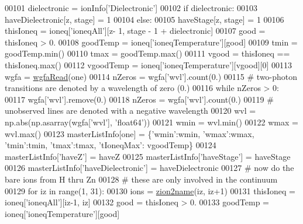 \begin{DoxyCode}
{{00101             dielectronic = ionInfo[\textcolor{stringliteral}{'Dielectronic'}]
00102             \textcolor{keywordflow}{if} dielectronic:
00103                 haveDielectronic[z, stage] = 1
00104             \textcolor{keywordflow}{else}:
00105                 haveStage[z, stage] = 1
00106             thisIoneq = ioneq[\textcolor{stringliteral}{'ioneqAll'}][z- 1, stage - 1 + dielectronic]
00107             good = thisIoneq > 0.
00108             goodTemp = ioneq[\textcolor{stringliteral}{'ioneqTemperature'}][good]
00109             tmin = goodTemp.min()
00110             tmax = goodTemp.max()
00111             vgood = thisIoneq == thisIoneq.max()
00112             vgoodTemp = ioneq[\textcolor{stringliteral}{'ioneqTemperature'}][vgood][0]
00113             wgfa = \hyperlink{namespacepyneb_1_1utils_1_1__chianti__tools_a3ef36a1d0a4df4cab94a392d2a3da980}{wgfaRead}(one)
00114             nZeros = wgfa[\textcolor{stringliteral}{'wvl'}].count(0.)
00115             \textcolor{comment}{# two-photon transitions are denoted by a wavelength of zero (0.)}
00116             \textcolor{keywordflow}{while} nZeros > 0:
00117                 wgfa[\textcolor{stringliteral}{'wvl'}].remove(0.)
00118                 nZeros = wgfa[\textcolor{stringliteral}{'wvl'}].count(0.)
00119             \textcolor{comment}{# unobserved lines are denoted with a negative wavelength}
00120             wvl = np.abs(np.asarray(wgfa[\textcolor{stringliteral}{'wvl'}], \textcolor{stringliteral}{'float64'}))
00121             wmin = wvl.min()
00122             wmax = wvl.max()
00123             masterListInfo[one] = \{\textcolor{stringliteral}{'wmin'}:wmin, \textcolor{stringliteral}{'wmax'}:wmax, \textcolor{stringliteral}{'tmin'}:tmin, \textcolor{stringliteral}{'tmax'}:tmax, \textcolor{stringliteral}{'tIoneqMax'}:
      vgoodTemp\}
00124         masterListInfo[\textcolor{stringliteral}{'haveZ'}] = haveZ
00125         masterListInfo[\textcolor{stringliteral}{'haveStage'}] = haveStage
00126         masterListInfo[\textcolor{stringliteral}{'haveDielectronic'}] = haveDielectronic
00127         \textcolor{comment}{#  now do the bare ions from H thru Zn}
00128         \textcolor{comment}{#  these are only involved in the continuum}
00129         \textcolor{keywordflow}{for} iz \textcolor{keywordflow}{in} range(1, 31):
00130             ions = \hyperlink{namespacepyneb_1_1utils_1_1__chianti__tools_a7d6debb5f68b52f64c311ca1fe99945c}{zion2name}(iz, iz+1)
00131             thisIoneq = ioneq[\textcolor{stringliteral}{'ioneqAll'}][iz-1, iz]
00132             good = thisIoneq > 0.
00133             goodTemp = ioneq[\textcolor{stringliteral}{'ioneqTemperature'}][good]
}}
\end{DoxyCode}
